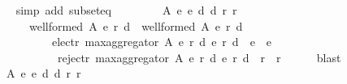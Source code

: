\begin{isabellebody}
\ \ \ \ \isamarkupfalse%
\ {\isacharparenleft}{\kern0pt}simp\ add{\isacharcolon}{\kern0pt}\ subset{\isacharunderscore}{\kern0pt}eq{\isacharparenright}{\kern0pt}\isanewline
\ \ \isamarkupfalse%
\ \isamarkupfalse%
\isanewline
\ \ \ \ {\isachardoublequoteopen}{\isasymforall}A\ e{}\ e{}\ d{}\ d{}\ r{}\ r{}{\isachardot}{\kern0pt}\isanewline
\ \ \ \ \ \ \ \ {\isacharparenleft}{\kern0pt}well{\isacharunderscore}{\kern0pt}formed\ A\ {\isacharparenleft}{\kern0pt}e{}{\isacharcomma}{\kern0pt}\ r{}{\isacharcomma}{\kern0pt}\ d{}{\isacharparenright}{\kern0pt}\ {\isasymand}\ well{\isacharunderscore}{\kern0pt}formed\ A\ {\isacharparenleft}{\kern0pt}e{}{\isacharcomma}{\kern0pt}\ r{}{\isacharcomma}{\kern0pt}\ d{}{\isacharparenright}{\kern0pt}{\isacharparenright}{\kern0pt}\ {\isasymlongrightarrow}\isanewline
\ \ \ \ \ \ \ \ \ \ \ \ {\isacharparenleft}{\kern0pt}elect{\isacharunderscore}{\kern0pt}r\ {\isacharparenleft}{\kern0pt}max{\isacharunderscore}{\kern0pt}aggregator\ A\ {\isacharparenleft}{\kern0pt}e{}{\isacharcomma}{\kern0pt}\ r{}{\isacharcomma}{\kern0pt}\ d{}{\isacharparenright}{\kern0pt}\ {\isacharparenleft}{\kern0pt}e{}{\isacharcomma}{\kern0pt}\ r{}{\isacharcomma}{\kern0pt}\ d{}{\isacharparenright}{\kern0pt}{\isacharparenright}{\kern0pt}\ {\isasymsubseteq}\ {\isacharparenleft}{\kern0pt}e{}\ {\isasymunion}\ e{}{\isacharparenright}{\kern0pt}\ {\isasymand}\isanewline
\ \ \ \ \ \ \ \ \ \ \ \ \ reject{\isacharunderscore}{\kern0pt}r\ {\isacharparenleft}{\kern0pt}max{\isacharunderscore}{\kern0pt}aggregator\ A\ {\isacharparenleft}{\kern0pt}e{}{\isacharcomma}{\kern0pt}\ r{}{\isacharcomma}{\kern0pt}\ d{}{\isacharparenright}{\kern0pt}\ {\isacharparenleft}{\kern0pt}e{}{\isacharcomma}{\kern0pt}\ r{}{\isacharcomma}{\kern0pt}\ d{}{\isacharparenright}{\kern0pt}{\isacharparenright}{\kern0pt}\ {\isasymsubseteq}\ {\isacharparenleft}{\kern0pt}r{}\ {\isasymunion}\ r{}{\isacharparenright}{\kern0pt}{\isacharparenright}{\kern0pt}{\isachardoublequoteclose}\isanewline
\ \ \ \ \isamarkupfalse%
\ blast\isanewline
\ \ \isamarkupfalse%
\ \isamarkupfalse%
\isanewline
\ \ \ \ {\isachardoublequoteopen}{\isasymforall}A\ e{}\ e{}\ d{}\ d{}\ r{}\ r{}{\isachardot}{\kern0pt}\isanewline

\end{isabellebody}
